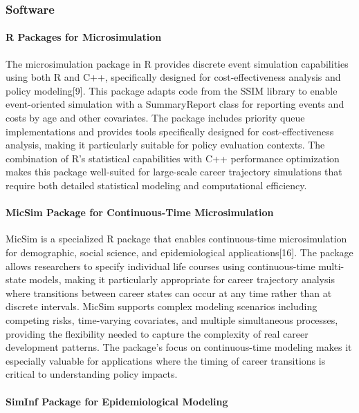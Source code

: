 \documentclass[main.tex]{subfiles}
\begin{document}
\subsubsection{Software}

\paragraph{R Packages for Microsimulation}

The microsimulation package in R provides discrete event simulation capabilities using both R and C++, specifically designed for cost-effectiveness analysis and policy modeling[9]. This package adapts code from the SSIM library to enable event-oriented simulation with a SummaryReport class for reporting events and costs by age and other covariates. The package includes priority queue implementations and provides tools specifically designed for cost-effectiveness analysis, making it particularly suitable for policy evaluation contexts. The combination of R's statistical capabilities with C++ performance optimization makes this package well-suited for large-scale career trajectory simulations that require both detailed statistical modeling and computational efficiency.

\paragraph{MicSim Package for Continuous-Time Microsimulation}

MicSim is a specialized R package that enables continuous-time microsimulation for demographic, social science, and epidemiological applications[16]. The package allows researchers to specify individual life courses using continuous-time multi-state models, making it particularly appropriate for career trajectory analysis where transitions between career states can occur at any time rather than at discrete intervals. MicSim supports complex modeling scenarios including competing risks, time-varying covariates, and multiple simultaneous processes, providing the flexibility needed to capture the complexity of real career development patterns. The package's focus on continuous-time modeling makes it especially valuable for applications where the timing of career transitions is critical to understanding policy impacts.

\paragraph{SimInf Package for Epidemiological Modeling}
\end{document}
